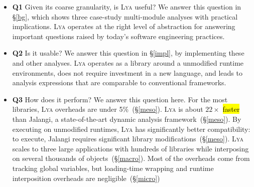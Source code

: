 \documentclass[letterpaper,twocolumn,10pt]{article}
\newcommand{\ttt}[1]{\texttt{#1}}
\newcommand{\sx}[1]{(\S\ref{#1})}
\newcommand{\sys}{{\scshape Lya}\xspace}
\newcommand{\todo}[1]{\hl{#1}\xspace}
\begin{document}
\begin{itemize}
  \item \textbf{Q1} Given its coarse granularity, is \sys useful?
    We answer this question in \S\ref{bg}, which shows three case-study multi-module analyses with practical implications.
    \sys operates at the right level of abstraction for answering important questions raised by today's software engineering practices.

  \item \textbf{Q2} Is it usable?
     We answer this question in \S\ref{impl}, by implementing these and other analyses.
    \sys operates as a library around a unmodified runtime environments, does not require investment in a new language, and leads to analysis expressions that are comparable to conventional frameworks.

  \item \textbf{Q3} How does it perform? We answer this question here.
  For the most libraries, \sys overheads are under 5\%~\sx{meso}.
  \sys is about $22\times$ \todo{faster} than Jalangi, a state-of-the-art dynamic analysis framework~\sx{meso}.
  By executing on unmodified runtimes, \sys has significantly better compatibility:
    to execute, Jalangi requires significant library modifications~\sx{meso}.
  \sys scales to three large applications with hundreds of libraries while interposing on several thousands of objects~\sx{macro}.
  Most of the overheads come from tracking global variables, but loading-time wrapping and runtime interposition overheads are negligible~\sx{micro}

\end{itemize}

\end{document}

